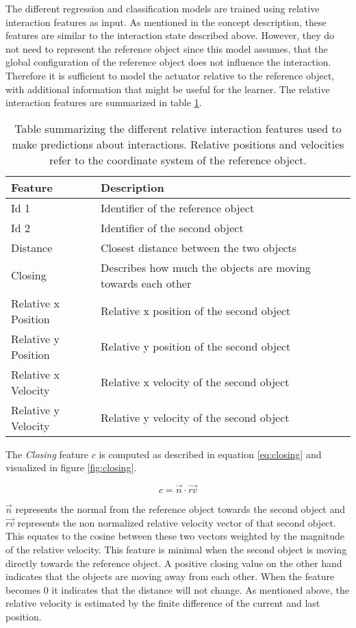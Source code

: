 The different regression and classification models are trained using relative interaction features as input. As mentioned in the concept description, these features are similar to the interaction state described above. However, they do not need to represent the reference object since this model assumes, that the global configuration of the reference object does not influence the interaction. Therefore it is sufficient to model the actuator relative to the reference object, with additional information that might be useful for the learner.
The relative interaction features are summarized in table \ref{tab:gateInteractionFeatures}. 

\begin{table}
	\centering
	\begin{tabular*}{\textwidth}{@{\extracolsep{\fill} } l l}
		\hline \textbf{Feature} & \textbf{Description} \\ 
		\hline \hline 
		 Id 1 & Identifier of the reference object \\ 
		 Id 2 & Identifier of the second object \\ 
		 Distance & Closest distance between the two objects \\
		 Closing & Describes how much the objects are moving towards each other \\
		 Relative x Position & Relative x position of the second object \\
		 Relative y Position & Relative y position of the second object \\
		 Relative x Velocity & Relative x velocity of the second object \\
		 Relative y Velocity & Relative y velocity of the second object \\
		\hline 
	\end{tabular*} 
	\caption{Table summarizing the different relative interaction features used to make predictions about interactions. Relative positions and velocities refer to the coordinate system of the reference object.}
	\label{tab:gateInteractionFeatures}
\end{table}

The \textit{Closing} feature $c$ is computed as described in equation \ref{eq:closing} and visualized in figure \ref{fig:closing}.

\begin{equation}
  c = \vec{n} \cdot \vec{rv}
 \label{eq:closing}
\end{equation}

$\vec{n}$ represents the normal from the reference object towards the second object and $\vec{rv}$ represents the non normalized relative velocity vector of that second object. This equates to the cosine between these two vectors weighted by the magnitude of the relative velocity. This feature is minimal when the second object is moving directly towards the reference object. A positive closing value on the other hand indicates that the objects are moving away from each other. When the feature becomes 0 it indicates that the distance will not change. As mentioned above, the relative velocity is estimated by the finite difference of the current and last position.


